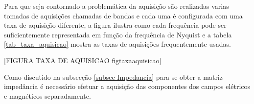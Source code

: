         Para que seja contornado a problemática da aquisição são realizadas varias tomadas de aquisições chamadas de bandas e cada uma é configurada com uma taxa de aquisição diferente, a figura \citar{\ref{fig_taxa_aquisicao}} ilustra como cada frequência pode ser suficientemente representada em função da frequência de Nyquist \cite{nyquist28} e a tabela \ref{tab_taxa_aquisicao} mostra as taxas de aquisições frequentemente usadas. 
        
        \begin{center} [FIGURA TAXA DE AQUISICAO figtaxaaquisicao]\end{center}
                                                  
        \begin{table}[H]
                \centering
                \caption{Taxas de Aquisições frequentemente usadas para equipamentos ADU06 e ADU07.}
                \label{tab_taxa_aquisicao}
            \end{table}
        
        Como discutido na subsecção \ref{subsec-Impedancia} para se obter a matriz impedância é necessário efetuar a aquisição das componentes dos campos elétricos e magnéticos separadamente.
        

